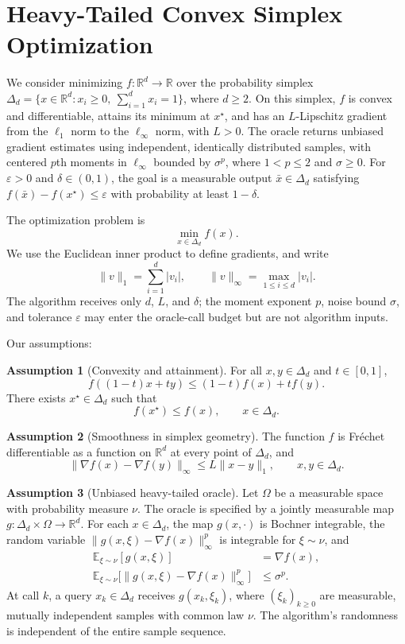 \documentclass[10pt]{article}
\theoremstyle{definition}
\newtheorem{assumption}{Assumption}
\begin{document}
\section*{Heavy-Tailed Convex Simplex Optimization}
We consider minimizing $f:\mathbb{R}^d\to\mathbb{R}$ over the probability simplex $\Delta_d=\{x\in\mathbb{R}^d:x_i\geq0,\ \sum_{i=1}^d x_i=1\}$, where $d\geq2$. On this simplex, $f$ is convex and differentiable, attains its minimum at $x^\star$, and has an $L$-Lipschitz gradient from the $\ell_1$ norm to the $\ell_\infty$ norm, with $L>0$. The oracle returns unbiased gradient estimates using independent, identically distributed samples, with centered $p$th moments in $\ell_\infty$ bounded by $\sigma^p$, where $1<p\leq2$ and $\sigma\geq0$. For $\varepsilon>0$ and $\delta\in(0,1)$, the goal is a measurable output $\bar{x}\in\Delta_d$ satisfying $f(\bar{x})-f(x^\star)\leq\varepsilon$ with probability at least $1-\delta$.

The optimization problem is
\[
\min_{x\in\Delta_d} f(x).
\]
We use the Euclidean inner product to define gradients, and write
\[
\|v\|_1=\sum_{i=1}^d |v_i|,
\qquad
\|v\|_\infty=\max_{1\leq i\leq d}|v_i|.
\]
The algorithm receives only $d$, $L$, and $\delta$; the moment exponent $p$, noise bound $\sigma$, and tolerance $\varepsilon$ may enter the oracle-call budget but are not algorithm inputs.

Our assumptions:
\begin{assumption}[Convexity and attainment]
For all $x,y\in\Delta_d$ and $t\in[0,1]$,
\[
f((1-t)x+ty)\leq(1-t)f(x)+t f(y).
\]
There exists $x^\star\in\Delta_d$ such that
\[
f(x^\star)\leq f(x),\qquad x\in\Delta_d.
\]
\end{assumption}

\begin{assumption}[Smoothness in simplex geometry]
The function $f$ is Fr\'echet differentiable as a function on $\mathbb{R}^d$ at every point of $\Delta_d$, and
\[
\|\nabla f(x)-\nabla f(y)\|_\infty
\leq L\|x-y\|_1,
\qquad x,y\in\Delta_d.
\]
\end{assumption}

\begin{assumption}[Unbiased heavy-tailed oracle]
Let $\Omega$ be a measurable space with probability measure $\nu$. The oracle is specified by a jointly measurable map $g:\Delta_d\times\Omega\to\mathbb{R}^d$. For each $x\in\Delta_d$, the map $g(x,\cdot)$ is Bochner integrable, the random variable $\|g(x,\xi)-\nabla f(x)\|_\infty^p$ is integrable for $\xi\sim\nu$, and
\[
\begin{aligned}
\mathbb{E}_{\xi\sim\nu}[g(x,\xi)]&=\nabla f(x),\\
\mathbb{E}_{\xi\sim\nu}\bigl[\|g(x,\xi)-\nabla f(x)\|_\infty^p\bigr]
&\leq\sigma^p.
\end{aligned}
\]
At call $k$, a query $x_k\in\Delta_d$ receives $g(x_k,\xi_k)$, where $(\xi_k)_{k\geq0}$ are measurable, mutually independent samples with common law $\nu$. The algorithm's randomness is independent of the entire sample sequence.
\end{assumption}
\end{document}
